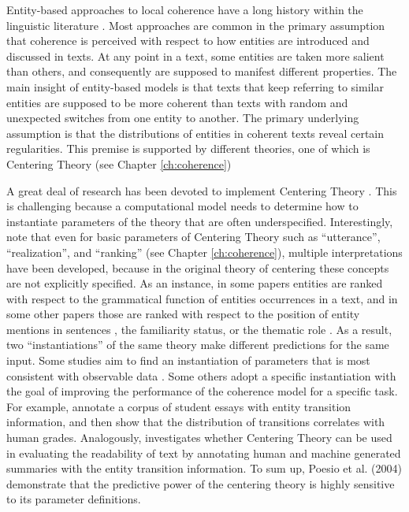 Entity-based approaches to local coherence have a long history within the linguistic literature \cite{kuno72,halliday76,prince81a,joshi98}.
Most approaches are common in the primary assumption that coherence is perceived with respect to how entities are introduced and discussed in texts. 
At any point in a text, some entities are taken more salient than others, and consequently are supposed to manifest different properties. 
The main insight of entity-based models is that texts that keep referring to similar  entities are supposed to be more coherent than texts with random and unexpected switches from one entity to another. 
The primary underlying assumption is that the distributions of entities in coherent texts reveal certain regularities. 
This premise is supported by different theories, one of which is Centering Theory \cite{grosz95,joshi98} (see Chapter \ref{ch:coherence})

A great deal of research has been devoted to implement Centering Theory \cite{miltsakaki00,karamanis04a}. 
This is challenging because a computational model needs to determine how to instantiate parameters of the theory that are often underspecified. 
Interestingly,  note that even for basic parameters of Centering Theory such as ``utterance'', ``realization'', and ``ranking'' (see Chapter \ref{ch:coherence}), multiple interpretations have been developed, because in the original theory of centering these concepts are not explicitly specified. 
As an instance, in some papers entities are ranked with respect to the grammatical function \cite{brennan87,grosz95} of entities occurrences in a text, and in some other papers those are ranked with respect to the position of entity mentions in sentences \cite{prince81a}, the familiarity status, or the thematic role \cite{strube.cl99,sidner04}.
As a result, two “instantiations” of the same theory make different predictions for the same input.  
Some studies aim to find an instantiation of parameters that is most consistent with observable data \cite{strube.cl99,karamanis04a,poesio04b}. 
Some others adopt a specific instantiation with the goal of improving the performance of the coherence model for a specific task. 
For example,  annotate a corpus of student essays with entity transition information, and then show that the distribution of transitions correlates with human grades. 
Analogously,  investigates whether Centering Theory can be used in evaluating the readability of text by annotating human and machine generated summaries with the entity transition information. 
To sum up, \newcite{}Poesio et al. (2004) demonstrate that the predictive power of the centering theory is highly sensitive to its parameter definitions. 

